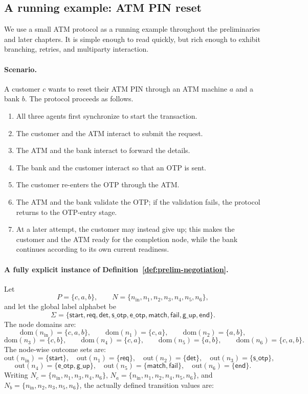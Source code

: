 \subsection{A running example: ATM PIN reset}
\label{subsec:prelim-neg-atm}

We use a small ATM protocol as a running example throughout the preliminaries and later chapters. It is simple enough to read quickly, but rich enough to exhibit branching, retries, and multiparty interaction.

\paragraph{Scenario.}
A customer $c$ wants to reset their ATM PIN through an ATM machine $a$ and a bank $b$. The protocol proceeds as follows.
\begin{enumerate}
    \item All three agents first synchronize to start the transaction.
    \item The customer and the ATM interact to submit the request.
    \item The ATM and the bank interact to forward the details.
    \item The bank and the customer interact so that an OTP is sent.
    \item The customer re-enters the OTP through the ATM.
    \item The ATM and the bank validate the OTP; if the validation fails, the protocol returns to the OTP-entry stage.
    \item At a later attempt, the customer may instead give up; this makes the customer and the ATM ready for the completion node, while the bank continues according to its own current readiness.
\end{enumerate}

\paragraph{A fully explicit instance of Definition~\ref{def:prelim-negotiation}.}
Let
\[
P=\{c,a,b\}, \qquad N=\{n_{\mathrm{in}},n_1,n_2,n_3,n_4,n_5,n_6\},
\]
and let the global label alphabet be
\[
\Sigma=\{\mathsf{start},\mathsf{req},\mathsf{det},\mathsf{s\_otp},\mathsf{e\_otp},\mathsf{match},\mathsf{fail},\mathsf{g\_up},\mathsf{end}\}.
\]
The node domains are:
\[
\mathrm{dom}(n_{\mathrm{in}})=\{c,a,b\},\qquad \mathrm{dom}(n_1)=\{c,a\},\qquad \mathrm{dom}(n_2)=\{a,b\},
\]
\[
\mathrm{dom}(n_3)=\{c,b\},\qquad \mathrm{dom}(n_4)=\{c,a\},\qquad \mathrm{dom}(n_5)=\{a,b\},\qquad \mathrm{dom}(n_6)=\{c,a,b\}.
\]
The node-wise outcome sets are:
\[
\mathrm{out}(n_{\mathrm{in}})=\{\mathsf{start}\},\quad \mathrm{out}(n_1)=\{\mathsf{req}\},\quad \mathrm{out}(n_2)=\{\mathsf{det}\},\quad \mathrm{out}(n_3)=\{\mathsf{s\_otp}\},
\]
\[
\mathrm{out}(n_4)=\{\mathsf{e\_otp},\mathsf{g\_up}\},\quad \mathrm{out}(n_5)=\{\mathsf{match},\mathsf{fail}\},\quad \mathrm{out}(n_6)=\{\mathsf{end}\}.
\]
Writing $N_c=\{n_{\mathrm{in}},n_1,n_3,n_4,n_6\}$, $N_a=\{n_{\mathrm{in}},n_1,n_2,n_4,n_5,n_6\}$, and $N_b=\{n_{\mathrm{in}},n_2,n_3,n_5,n_6\}$, the actually defined transition values are:

